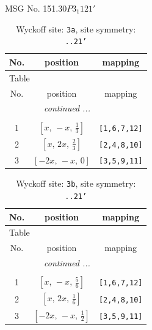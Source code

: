 \documentclass[fleqn,8pt]{jsarticle}
\begin{document}
\setcounter{MaxMatrixCols}{32}

\renewcommand{\tablename}{Table~}
\renewcommand{\figurename}{Figure~}
\begin{center}
\LARGE
MSG No. 151.30\quad$P3_{1}121'$
\end{center}
\renewcommand{\arraystretch}{1.2}
\begin{longtable}{ccc}
\caption{Wyckoff site: {\tt 3a}, site symmetry: {\tt ..21'}}
 \\
 \hline \hline
No. & position & mapping \\ \hline \endfirsthead

\multicolumn{2}{l}{\tablename\ \thetable{}} \\
 \hline \hline
No. & position & mapping \\ \hline \endhead

 \hline \hline
\multicolumn{2}{r}{\footnotesize\it continued ...} \\ \endfoot

 \hline \hline
\multicolumn{2}{r}{} \\ \endlastfoot

1 & $\left[ x,\, - x,\, \frac{1}{3} \right]$ & {\tt [1,6,7,12]} \\ \hline
2 & $\left[ x,\, 2 x,\, \frac{2}{3} \right]$ & {\tt [2,4,8,10]} \\ \hline
3 & $\left[ - 2 x,\, - x,\, 0 \right]$ & {\tt [3,5,9,11]} \\
\end{longtable}
\renewcommand{\arraystretch}{1.2}
\begin{longtable}{ccc}
\caption{Wyckoff site: {\tt 3b}, site symmetry: {\tt ..21'}}
 \\
 \hline \hline
No. & position & mapping \\ \hline \endfirsthead

\multicolumn{2}{l}{\tablename\ \thetable{}} \\
 \hline \hline
No. & position & mapping \\ \hline \endhead

 \hline \hline
\multicolumn{2}{r}{\footnotesize\it continued ...} \\ \endfoot

 \hline \hline
\multicolumn{2}{r}{} \\ \endlastfoot

1 & $\left[ x,\, - x,\, \frac{5}{6} \right]$ & {\tt [1,6,7,12]} \\ \hline
2 & $\left[ x,\, 2 x,\, \frac{1}{6} \right]$ & {\tt [2,4,8,10]} \\ \hline
3 & $\left[ - 2 x,\, - x,\, \frac{1}{2} \right]$ & {\tt [3,5,9,11]} \\
\end{longtable}
\end{document}
